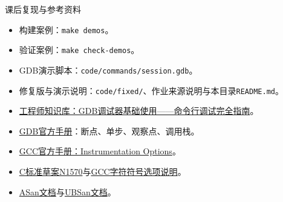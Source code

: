 \begin{frame}{课后复现与参考资料}
    \small
    \begin{itemize}
        \item \alert{构建案例}：\texttt{make demos}。
        \item \alert{验证案例}：\texttt{make check-demos}。
        \item \alert{GDB演示脚本}：\texttt{code/commands/session.gdb}。
        \item \alert{修复版与演示说明}：\texttt{code/fixed/}、作业来源说明与本目录\texttt{README.md}。
    \end{itemize}
    \medskip
    \begin{itemize}
        \item \href{https://x-gen-lab.github.io/knowledge-os/02-technologies/embedded/08-toolchain/02-debugging-testing/beginner/02-gdb-basics/}{工程师知识库：GDB调试器基础使用——命令行调试完全指南}。
        \item \href{https://sourceware.org/gdb/current/onlinedocs/gdb.html/}{GDB官方手册}：断点、单步、观察点、调用栈。
        \item \href{https://gcc.gnu.org/onlinedocs/gcc/Instrumentation-Options.html}{GCC官方手册：Instrumentation Options}。
        \item \href{https://www.open-std.org/JTC1/SC22/WG14/www/docs/n1570.pdf}{C标准草案N1570}与\href{https://gcc.gnu.org/onlinedocs/gcc/C-Dialect-Options.html}{GCC字符符号选项说明}。
        \item \href{https://clang.llvm.org/docs/AddressSanitizer.html}{ASan文档}与\href{https://clang.llvm.org/docs/UndefinedBehaviorSanitizer.html}{UBSan文档}。
    \end{itemize}
\end{frame}

